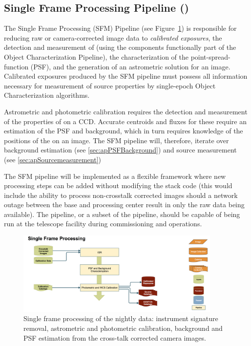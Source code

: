 \subsection{Single Frame Processing Pipeline (\wbsSFM)}
\label{sec:apSingleFrameProcessing}

The Single Frame Processing (SFM) Pipeline (see Figure~\ref{fig:apSFM}) is responsible for reducing raw or camera-corrected image data to \emph{calibrated exposures}, the detection and measurement of \Sources (using the components functionally  part of the Object Characterization Pipeline), the characterization of the point-spread-function (PSF), and the generation of an astrometric solution for an image. Calibrated exposures produced by the SFM pipeline must possess all information necessary for measurement of source properties by single-epoch Object Characterization algorithms.

Astrometric and photometric calibration requires the detection and measurement of the properties of \Sources on a CCD. Accurate centroids and fluxes for these \Sources require an estimation of the PSF and background, which in turn requires knowledge of the positions of the \Sources on an image. The SFM pipeline will, therefore, iterate over background estimation (see \ref{sec:apPSFBackground}) and source measurement (see \ref{sec:apSourcemeasurement})

The SFM pipeline will be implemented as a flexible framework where new processing steps can be added without modifying the stack code (this would include the ability to process non-crosstalk corrected images should a network outage between the base and processing center result in  only the raw data being available). The pipeline, or a subset of the pipeline, should be capable of being run at the telescope facility during commissioning and operations.  

\begin{figure}[th]
\begin{center}
\includegraphics[width=0.9\textwidth]{figures/SFM.png}
\caption{\label{fig:apSFM} Single frame processing of the nightly data: instrument signature removal, astrometric and photometric calibration, background and PSF estimation from the cross-talk corrected camera images.}
\end{center}
\end{figure}

